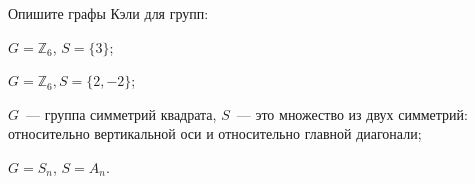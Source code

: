 Опишите графы Кэли для групп:
\begin{enumcyr}
    \item $G = \mathbb{Z}_6$, $S = \{3\}$;
    \item $G = \mathbb{Z}_6, S = \{2, -2\}$;
    \item $G$~--- группа симметрий квадрата, $S$~--- это множество из двух симметрий: относительно вертикальной оси и
	    относительно главной диагонали;
    \item $G = S_n$, $S = A_n$.
\end{enumcyr}
